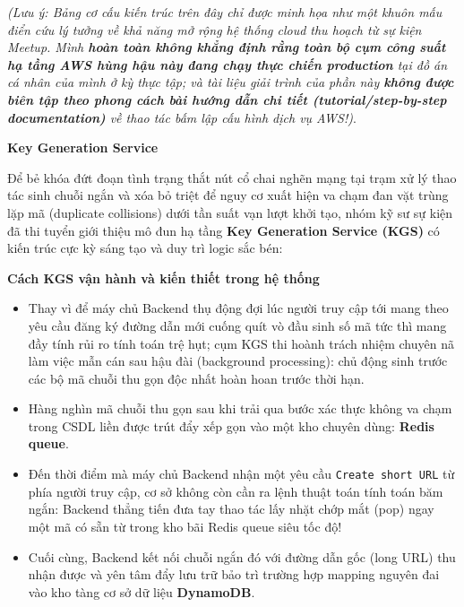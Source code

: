 \emph{(Lưu ý: Bảng cơ cấu kiến trúc trên đây chỉ được minh họa như một
khuôn mấu điển cứu lý tưởng về khả năng mở rộng hệ thống cloud thu hoạch
từ sự kiện Meetup. Mình \textbf{hoàn toàn không khẳng định rằng toàn bộ
cụm công suất hạ tầng AWS hùng hậu này đang chạy thực chiến production}
tại đồ án cá nhân của mình ở kỳ thực tập; và tài liệu giải trình của
phần này \textbf{không được biên tập theo phong cách bài hướng dẫn chi
tiết (tutorial/step-by-step documentation)} về thao tác bấm lập cấu hình
dịch vụ AWS!)}.

\vspace{0.5em}\noindent\textbf{Key Generation Service}\par

Để bẻ khóa đứt đoạn tình trạng thắt nút cổ chai nghẽn mạng tại trạm xử
lý thao tác sinh chuỗi ngắn và xóa bỏ triệt để nguy cơ xuất hiện va chạm
đan vặt trùng lặp mã (duplicate collisions) dưới tần suất vạn lượt khởi
tạo, nhóm kỹ sư sự kiện đã thi tuyển giới thiệu mô đun hạ tầng
\textbf{Key Generation Service (KGS)} có kiến trúc cực kỳ sáng tạo và
duy trì logic sắc bén:

\vspace{0.5em}\noindent\textbf{Cách KGS vận hành và kiến thiết trong hệ
thống}\par

\begin{itemize}
\tightlist
\item
  Thay vì để máy chủ Backend thụ động đợi lúc người truy cập tới mang
  theo yêu cầu đăng ký đường dẫn mới cuống quít vò đầu sinh số mã tức
  thì mang đầy tính rủi ro tính toán trệ hụt; cụm KGS thi hoành trách
  nhiệm chuyên nã làm việc mẫn cán sau hậu đài (background processing):
  chủ động sinh trước các bộ mã chuỗi thu gọn độc nhất hoàn hoan trước
  thời hạn.
\item
  Hàng nghìn mã chuỗi thu gọn sau khi trải qua bước xác thực không va
  chạm trong CSDL liền được trút đẩy xếp gọn vào một kho chuyên dùng:
  \textbf{Redis queue}.
\item
  Đến thời điểm mà máy chủ Backend nhận một yêu cầu
  \texttt{Create\ short\ URL} từ phía người truy cập, cơ sở không còn
  cần ra lệnh thuật toán tính toán băm ngắn: Backend thẳng tiến đưa tay
  thao tác lấy nhặt chớp mắt (pop) ngay một mã có sẵn từ trong kho bãi
  Redis queue siêu tốc độ!
\item
  Cuối cùng, Backend kết nối chuỗi ngắn đó với đường dẫn gốc (long URL)
  thu nhận được và yên tâm đẩy lưu trữ bảo trì trường hợp mapping nguyên
  đai vào kho tàng cơ sở dữ liệu \textbf{DynamoDB}.
\end{itemize}

